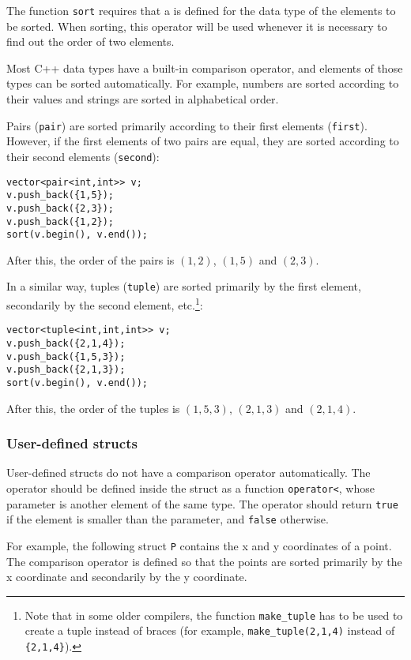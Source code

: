 
The function \texttt{sort} requires that
a  is defined for the data type
of the elements to be sorted.
When sorting, this operator will be used
whenever it is necessary to find out the order of two elements.

Most C++ data types have a built-in comparison operator,
and elements of those types can be sorted automatically.
For example, numbers are sorted according to their values
and strings are sorted in alphabetical order.


Pairs (\texttt{pair}) are sorted primarily according to their
first elements (\texttt{first}).
However, if the first elements of two pairs are equal,
they are sorted according to their second elements (\texttt{second}):
\begin{lstlisting}
vector<pair<int,int>> v;
v.push_back({1,5});
v.push_back({2,3});
v.push_back({1,2});
sort(v.begin(), v.end());
\end{lstlisting}
After this, the order of the pairs is
$(1,2)$, $(1,5)$ and $(2,3)$.


In a similar way, tuples (\texttt{tuple})
are sorted primarily by the first element,
secondarily by the second element, etc.\footnote{Note that in some older compilers,
the function \texttt{make\_tuple} has to be used to create a tuple instead of
braces (for example, \texttt{make\_tuple(2,1,4)} instead of \texttt{\{2,1,4\}}).}:
\begin{lstlisting}
vector<tuple<int,int,int>> v;
v.push_back({2,1,4});
v.push_back({1,5,3});
v.push_back({2,1,3});
sort(v.begin(), v.end());
\end{lstlisting}
After this, the order of the tuples is
$(1,5,3)$, $(2,1,3)$ and $(2,1,4)$.

\subsubsection{User-defined structs}

User-defined structs do not have a comparison
operator automatically.
The operator should be defined inside
the struct as a function
\texttt{operator<},
whose parameter is another element of the same type.
The operator should return \texttt{true}
if the element is smaller than the parameter,
and \texttt{false} otherwise.

For example, the following struct \texttt{P}
contains the x and y coordinates of a point.
The comparison operator is defined so that
the points are sorted primarily by the x coordinate
and secondarily by the y coordinate.

